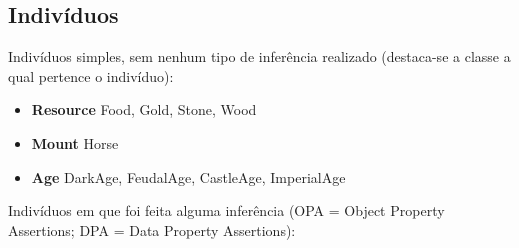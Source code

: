 \documentclass[10pt,a4paper]{article}
\begin{document}
\subsection{Indivíduos}

Indivíduos simples, sem nenhum tipo de inferência realizado (destaca-se a classe a qual pertence o indivíduo):

\begin{itemize}
    \item \textbf{Resource} Food, Gold, Stone, Wood
    \item \textbf{Mount} Horse
    \item \textbf{Age} DarkAge, FeudalAge, CastleAge, ImperialAge
\end{itemize}

Indivíduos em que foi feita alguma inferência (OPA = Object Property Assertions; DPA = Data Property Assertions):
\end{document}
